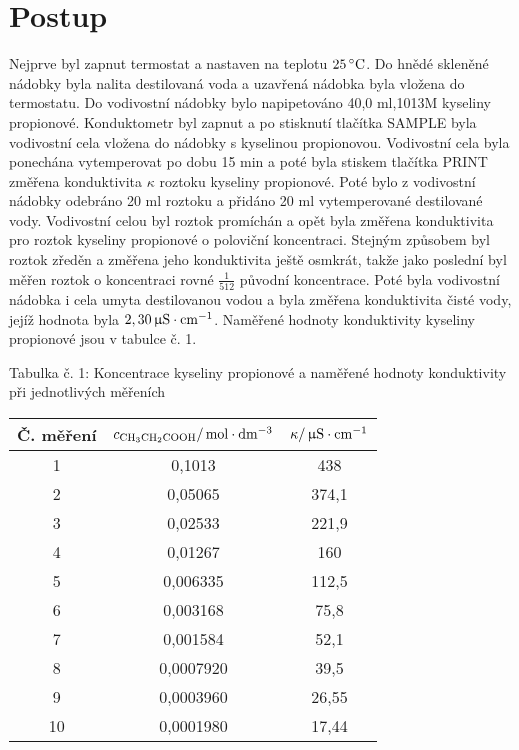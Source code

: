\documentclass[12pt,a4paper]{article}
\def\ri#1{\mathrm{#1}}
\def\jd#1{\ifmmode\,\mathrm{#1}\else\,\textrm{#1}\fi}
\begin{document}
\section*{Postup}
\noindent Nejprve byl zapnut termostat a nastaven na teplotu $25\jd{^\circ C}$. Do hnědé skleněné nádobky byla nalita destilovaná voda a uzavřená nádobka byla vložena do termostatu. Do vodivostní nádobky bylo napipetováno 40,0\jd{ml} 0,1013M kyseliny propionové. Konduktometr byl zapnut a po stisknutí tlačítka SAMPLE byla vodivostní cela vložena do nádobky s kyselinou propionovou. Vodivostní cela byla ponechána vytemperovat po dobu 15\jd{min} a poté byla stiskem tlačítka PRINT změřena konduktivita $\kappa$ roztoku kyseliny propionové. Poté bylo z vodivostní nádobky odebráno 20\jd{ml} roztoku a přidáno 20\jd{ml} vytemperované destilované vody. Vodivostní celou byl roztok promíchán a opět byla změřena konduktivita pro roztok kyseliny propionové o poloviční koncentraci. Stejným způsobem byl roztok zředěn a změřena jeho konduktivita ještě osmkrát, takže jako poslední byl měřen roztok o koncentraci rovné $\frac{1}{512}$ původní koncentrace. Poté byla vodivostní nádobka i cela umyta destilovanou vodou a byla změřena konduktivita  čisté vody, jejíž hodnota byla $2,30\jd{\upmu S\cdot cm^{-1}}$. Naměřené hodnoty konduktivity kyseliny propionové jsou v tabulce č. 1.
\begin{center}
	\noindent Tabulka č. 1: Koncentrace kyseliny propionové a naměřené hodnoty konduktivity při jednotlivých měřeních
	\begin{tabular}{c|c|c}
		Č. měření & $c_\ri{CH_3CH_2COOH}/\jd{mol\cdot dm^{-3}}$ & $\kappa/\jd{\upmu S\cdot cm^{-1}}$\\
		\hline
		1 & 0,1013 & 438\\
		2 & 0,05065 & 374,1\\
		3 & 0,02533 & 221,9\\
		4 & 0,01267 & 160\\
		5 & 0,006335 & 112,5\\
		6 & 0,003168 & 75,8\\
		7 & 0,001584 & 52,1\\
		8 & 0,0007920 & 39,5\\
		9 & 0,0003960 & 26,55\\
		10 & 0,0001980 & 17,44\\
	\end{tabular}
\end{center}
\end{document}
